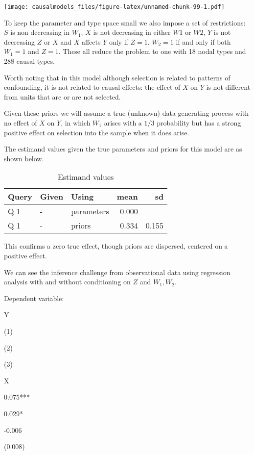 \documentclass[
  12pt,
]{book}
\begin{document}
\texttt{[image: causalmodels\_files/figure-latex/unnamed-chunk-99-1.pdf]}

To keep the parameter and type space small we also impose a set of restrictions: \(S\) is non decreasing in \(W_1\), \(X\) is not decreasing in either \(W1\) or \(W2\), \(Y\) is not decreasing \(Z\) or \(X\) and \(X\) affects \(Y\) only if \(Z=1\). \(W_2=1\) if and only if both \(W_1=1\) and \(Z=1\). These all reduce the problem to one with 18 nodal types and 288 causal types.

Worth noting that in this model although selection is related to patterns of confounding, it is not related to causal effects: the effect of \(X\) on \(Y\) is not different from units that are or are not selected.

Given these priors we will assume a true (unknown) data generating process with no effect of \(X\) on \(Y\), in which \(W_1\) arises with a \(1/3\) probability but has a strong positive effect on selection into the sample when it does arise.

The estimand values given the true parameters and priors for this model are as shown below.

\begin{table}

\caption{\label{tab:appsimpleselcconf5}Estimand values}
\centering
\begin{tabular}[t]{l|l|l|r|r}
\hline
Query & Given & Using & mean & sd\\
\hline
Q 1 & - & parameters & 0.000 & \\
\hline
Q 1 & - & priors & 0.334 & 0.155\\
\hline
\end{tabular}
\end{table}

This confirms a zero true effect, though priors are dispersed, centered on a positive effect.

We can see the inference challenge from observational data using regression analysis with and without conditioning on \(Z\) and \(W_1, W_2\).

Dependent variable:

Y

(1)

(2)

(3)

X

0.075***

0.029*

-0.006

(0.008)
\end{document}
